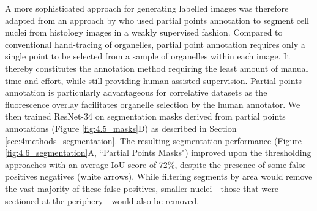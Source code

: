 A more sophisticated approach for generating labelled images was therefore adapted from an approach by \textcite{qu2020weakly} who used partial points annotation to segment cell nuclei from histology images in a weakly supervised fashion. Compared to conventional hand-tracing of organelles, partial point annotation requires only a single point to be selected from a sample of organelles within each image. It thereby constitutes the annotation method requiring the least amount of manual time and effort, while still providing human-assisted supervision. Partial points annotation is particularly advantageous for correlative datasets as the fluorescence overlay facilitates organelle selection by the human annotator. We then trained ResNet-34 on segmentation masks derived from partial points annotations (Figure \ref{fig:4.5_masks}D) as described in Section \ref{sec:4methods_segmentation}. The resulting segmentation performance (Figure \ref{fig:4.6_segmentation}A, ``Partial Points Masks") improved upon the thresholding approaches with an average IoU score of 72\%, despite the presence of some false positives negatives (white arrows). While filtering segments by area would remove the vast majority of these false positives, smaller nuclei---those that were sectioned at the periphery---would also be removed.
